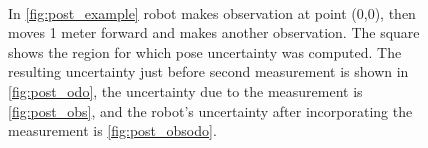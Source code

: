 \begin{figure}
\begin{center}
\\
\quad\space
{}
\end{center}
\caption{In \ref{fig:post_example} robot makes observation at point (0,0),
then moves 1 meter forward and makes another observation. The square
shows the region for which pose uncertainty was computed. The
resulting uncertainty just before second measurement is shown in
\ref{fig:post_odo}, the uncertainty due to the measurement is
\ref{fig:post_obs}, and the robot's uncertainty after incorporating
the measurement is \ref{fig:post_obsodo}.}
\label{fig:post_all}
\end{figure}

